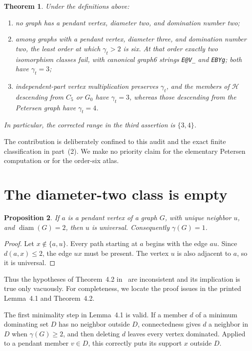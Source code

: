 \documentclass[11pt]{article}
\newtheorem{theorem}{Theorem}
\newtheorem{proposition}[theorem]{Proposition}
\theoremstyle{remark}
\newcommand{\diam}{\operatorname{diam}}
\begin{document}
\begin{theorem}\label{thm:summary}
Under the definitions above:
\begin{enumerate}
\item no graph has a pendant vertex, diameter two, and domination number two;
\item among graphs with a pendant vertex, diameter three, and domination
  number two, the least order at which \(\gamma_t>2\) is six.  At that order
  exactly two isomorphism classes fail, with canonical graph6 strings
  \texttt{E@V\_} and \texttt{EBYg}; both have \(\gamma_t=3\);
\item independent-part vertex multiplication preserves \(\gamma_t\), and the
  members of \(\mathcal H\) descending from \(C_5\) or \(G_0\) have
  \(\gamma_t=3\), whereas those descending from the Petersen graph have
  \(\gamma_t=4\).
\end{enumerate}
In particular, the corrected range in the third assertion is \(\{3,4\}\).
\end{theorem}

The contribution is deliberately confined to this audit and the exact finite
classification in part~(2).  We make no priority claim for the elementary
Petersen computation or for the order-six atlas.

\section{The diameter-two class is empty}

\begin{proposition}\label{prop:vacuous}
If \(a\) is a pendant vertex of a graph \(G\), with unique neighbor \(u\), and
\(\diam(G)=2\), then \(u\) is universal.  Consequently \(\gamma(G)=1\).
\end{proposition}

\begin{proof}
Let \(x\notin\{a,u\}\).  Every path starting at \(a\) begins with the edge
\(au\).  Since \(d(a,x)\leq2\), the edge \(ux\) must be present.  The vertex
\(u\) is also adjacent to \(a\), so it is universal.
\end{proof}

Thus the hypotheses of Theorem~4.2 in~\cite{Bera2026} are inconsistent and
its implication is true only vacuously.  For completeness, we locate the proof
issues in the printed Lemma~4.1 and Theorem~4.2.

The first minimality step in Lemma~4.1 is valid.  If a member \(d\) of a
minimum dominating set \(D\) has no neighbor outside \(D\), connectedness
gives \(d\) a neighbor in \(D\) when \(\gamma(G)\geq2\), and then deleting
\(d\) leaves every vertex dominated.  Applied to a pendant member \(v\in D\),
this correctly puts its support \(x\) outside \(D\).
\end{document}

